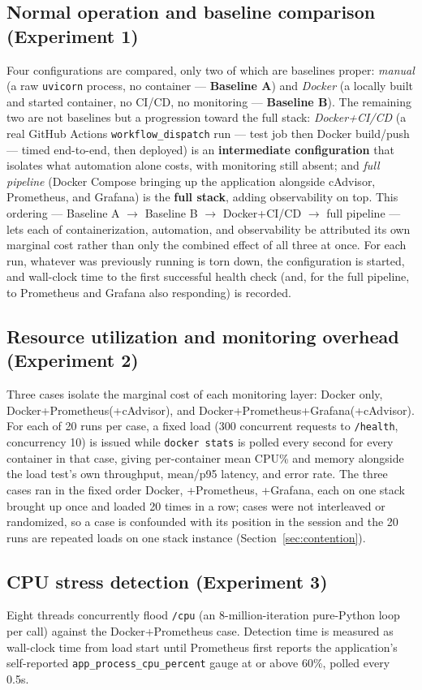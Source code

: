 \documentclass[conference]{IEEEtran}
\begin{document}
\subsection{Normal operation and baseline comparison (Experiment 1)}
Four configurations are compared, only two of which are baselines proper:
\emph{manual} (a raw \texttt{uvicorn} process, no container ---
\textbf{Baseline A}) and \emph{Docker} (a locally built and started
container, no CI/CD, no monitoring --- \textbf{Baseline B}). The remaining
two are not baselines but a progression toward the full stack: \emph{Docker+CI/CD} (a real GitHub Actions
\texttt{workflow\_dispatch} run --- test job then Docker build/push --- timed
end-to-end, then deployed) is an \textbf{intermediate configuration} that
isolates what automation alone costs, with monitoring still absent; and
\emph{full pipeline} (Docker Compose bringing up the application alongside
cAdvisor, Prometheus, and Grafana) is the \textbf{full stack}, adding
observability on top. This ordering --- Baseline A $\to$ Baseline B $\to$
Docker+CI/CD $\to$ full pipeline --- lets each of containerization,
automation, and observability be attributed its own marginal cost rather
than only the combined effect of all three at once. For each run, whatever
was previously running is torn
down, the configuration is started, and wall-clock time to the first
successful health check (and, for the full pipeline, to Prometheus and
Grafana also responding) is recorded.

\subsection{Resource utilization and monitoring overhead (Experiment 2)}
Three cases isolate the marginal cost of each monitoring layer: Docker only,
Docker+Prometheus(+cAdvisor), and Docker+Prometheus+Grafana(+cAdvisor). For
each of 20 runs per case, a fixed load (300 concurrent requests to
\texttt{/health}, concurrency 10) is issued while \texttt{docker stats} is
polled every second for every container in that case, giving per-container
mean CPU\% and memory alongside the load test's own throughput, mean/p95
latency, and error rate. The three cases ran in the fixed order Docker,
+Prometheus, +Grafana, each on one stack brought up once and loaded 20 times in
a row; cases were not interleaved or randomized, so a case is confounded with its
position in the session and the 20 runs are repeated loads on one stack
instance (Section~\ref{sec:contention}).

\subsection{CPU stress detection (Experiment 3)}
Eight threads concurrently flood \texttt{/cpu} (an 8-million-iteration
pure-Python loop per call) against the Docker+Prometheus case. Detection
time is measured as wall-clock time from load start until Prometheus first
reports the application's self-reported \texttt{app\_process\_cpu\_percent}
gauge at or above 60\%, polled every 0.5s.
\end{document}
